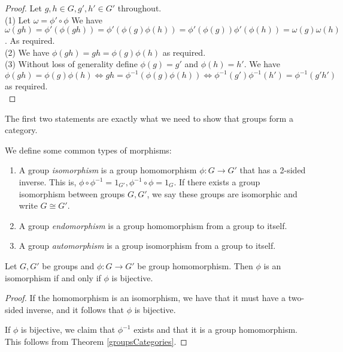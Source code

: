 \begin{proof}
  Let $g,h\in G, g',h'\in G'$ throughout. \\
    (1) Let $\omega = \phi' \circ \phi $ We have $\omega(gh)= \phi'(\phi(gh))=
      \phi'(\phi(g)\phi(h)) =\phi'(\phi(g)) \phi'(\phi(h)) = \omega(g)\omega(h) $. As
      required. \\
    
    (2) We have $\phi(gh) = gh = \phi(g)\phi(h)$ as required. \\
    
    (3) Without loss of generality define $\phi(g) = g'$ and $\phi(h) = h'$. We have 
    $\phi(gh) = \phi(g)\phi(h) \iff gh = \phi^{-1}(\phi(g)\phi(h)) \iff \phi^{-1}(g')\phi^{-1}(h') = \phi^{-1}(g'h')$ as required. \\
\end{proof}

\begin{remark}
   The first two statements are exactly what we need to show that groups form a category.
\end{remark}


\begin{definition}
    We define some common types of morphisms:
  \begin{enumerate}
    \item A group \emph{isomorphism} is a group homomorphism $\phi:G\to G'$ that has a
      2-sided inverse. This is, $\phi\circ\phi^{-1}=1_{G'},\phi^{-1}\circ\phi=1_G$. If
      there exists a group isomorphism between groups $G,G'$, we say these groups are
      isomorphic and write $G\cong G'$. 
    \item A group \emph{endomorphism} is a group homomorphism from a group to itself.
    \item A group \emph{automorphism} is a group isomorphism from a group to itself.
  \end{enumerate}
  \label{morphismZoo}
\end{definition}

\begin{theorem}
  Let $G,G'$ be groups and $\phi:G\to G'$ be group homomorphism. Then $\phi$ is an
  isomorphism if and only if $\phi$ is bijective.
  \label{isomorphismBijective}
\end{theorem}
\begin{proof}
  If the homomorphism is an isomorphism, we have that it must have a two-sided inverse,
  and it follows that $\phi$ is bijective. 

  If $\phi$ is bijective, we claim that $\phi^{-1}$ exists and that it is a group
  homomorphism. This follows from Theorem \ref{groupsCategories}.
\end{proof}

